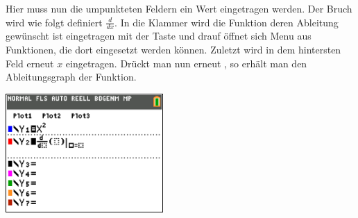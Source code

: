 \begin{paracol}{2}
\begin{flushleft}
	Hier muss nun die umpunkteten Feldern ein Wert eingetragen werden. Der Bruch wird wie folgt definiert $\frac{d}{dx}$. In die Klammer wird die Funktion deren Ableitung gewünscht ist eingetragen mit der Taste  und  drauf öffnet sich Menu aus Funktionen, die dort eingesetzt werden können. Zuletzt wird in dem hintersten Feld erneut $x$ eingetragen. Drückt man nun erneut , so erhält man den Ableitungsgraph der Funktion.
	\end{flushleft}	
\switchcolumn
\begin{flushright}
\includegraphics[width=6cm]{Media/GRT/Visualisierung/ableitung_bestimmen/ableitung_bestimmen_3.png}
\end{flushright}
\end{paracol}
\pagebreak

\pagebreak
